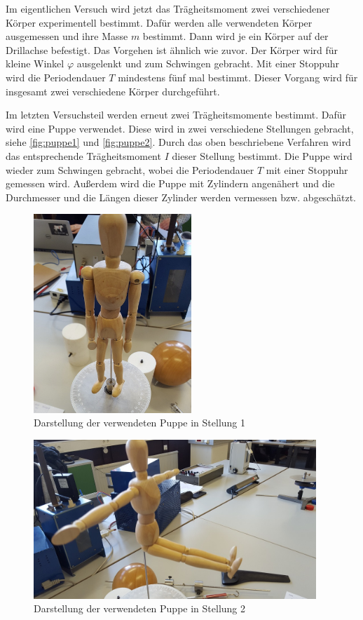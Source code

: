 Im eigentlichen Versuch wird jetzt das Trägheitsmoment zwei verschiedener Körper experimentell bestimmt. 
Dafür werden alle verwendeten Körper ausgemessen und ihre Masse $m$ bestimmt. 
Dann wird je ein Körper auf der Drillachse befestigt. 
Das Vorgehen ist ähnlich wie zuvor. 
Der Körper wird für kleine Winkel $\varphi$ ausgelenkt und zum Schwingen gebracht. 
Mit einer Stoppuhr wird die Periodendauer $T$ mindestens fünf mal bestimmt. 
Dieser Vorgang wird für insgesamt zwei verschiedene Körper durchgeführt.

Im letzten Versuchsteil werden erneut zwei Trägheitsmomente bestimmt. Dafür wird eine Puppe verwendet.
Diese wird in zwei verschiedene Stellungen gebracht, siehe \autoref{fig:puppe1} und \autoref{fig:puppe2}. 
Durch das oben beschriebene Verfahren wird das entsprechende Trägheitsmoment $I$ dieser Stellung bestimmt. 
Die Puppe wird wieder zum Schwingen gebracht, wobei die Periodendauer $T$ mit einer Stoppuhr gemessen wird.
Außerdem wird die Puppe mit Zylindern angenähert und die Durchmesser und die Längen dieser Zylinder werden vermessen bzw. abgeschätzt.

\begin{figure}
    \centering
    \includegraphics[height=7.5cm]{images/foto_7.jpg}
    \caption{Darstellung der verwendeten Puppe in Stellung 1 \cite{V101}}
    \label{fig:puppe1}
\end{figure}

\begin{figure}
    \centering
    \includegraphics[height=6cm]{images/foto_9.jpg}
    \caption{Darstellung der verwendeten Puppe in Stellung 2 \cite{V101}}
    \label{fig:puppe2}
\end{figure}